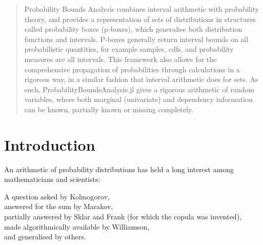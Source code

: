 \documentclass{juliacon}
\begin{document}


\maketitle

\begin{abstract}

Probability Bounds Analysis combines interval arithmetic with probability theory, and provides a representation of sets of distributions in structures called probability boxes (p-boxes), which generalise both distribution functions and intervals. P-boxes generally return interval bounds on all probabilistic quantities, for example samples, cdfs, and probability measures are all intervals. This framework also allows for the comprehensive propagation of probabilities through calculations in a rigorous way, in a similar fashion that interval arithmetic does for sets. As such, ProbabilityBoundsAnalysis.jl gives a rigorous arithmetic of random variables, where both marginal (univariate) and dependency information can be known, partially known or missing completely.

\end{abstract}

\section{Introduction}
\label{sec:intro}


An arithmetic of probability distributions has held a long interest among mathematicians and scientists:
\begin{displayquote}
  A question asked by Kolmogorov, \\
  answered for the sum by Marakov, \\
  partially answered by Sklar and Frank (for which the copula was invented),\\
  made algorithmically available by Williamson, \\
  and generalised by others.
\end{displayquote}
\end{document}
